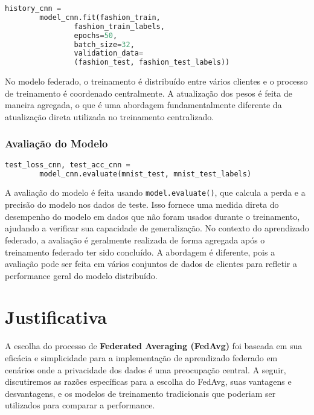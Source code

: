 \begin{lstlisting}[language=Python, caption={Treinamento do modelo centralizado}, label={lst:centralized_training}]
    history_cnn = 
        model_cnn.fit(fashion_train, 
                fashion_train_labels,
                epochs=50,
                batch_size=32,
                validation_data=
                (fashion_test, fashion_test_labels))
\end{lstlisting}

No modelo federado, o treinamento é distribuído entre vários clientes e o processo de treinamento é coordenado centralmente. A atualização dos pesos é feita de maneira agregada, o que é uma abordagem fundamentalmente diferente da atualização direta utilizada no treinamento centralizado.

\subsubsection{Avaliação do Modelo}

\begin{lstlisting}[language=Python, caption={Avaliação do modelo centralizado}, label={lst:centralized_evaluation}]
    test_loss_cnn, test_acc_cnn = 
        model_cnn.evaluate(mnist_test, mnist_test_labels)
\end{lstlisting}

A avaliação do modelo é feita usando \texttt{model.evaluate()}, que calcula a perda e a precisão do modelo nos dados de teste. Isso fornece uma medida direta do desempenho do modelo em dados que não foram usados durante o treinamento, ajudando a verificar sua capacidade de generalização. No contexto do aprendizado federado, a avaliação é geralmente realizada de forma agregada após o treinamento federado ter sido concluído. A abordagem é diferente, pois a avaliação pode ser feita em vários conjuntos de dados de clientes para refletir a performance geral do modelo distribuído.

\section{Justificativa}

A escolha do processo de \textbf{Federated Averaging (FedAvg)} foi baseada em sua eficácia e simplicidade para a implementação de aprendizado federado em cenários onde a privacidade dos dados é uma preocupação central. A seguir, discutiremos as razões específicas para a escolha do FedAvg, suas vantagens e desvantagens, e os modelos de treinamento tradicionais que poderiam ser utilizados para comparar a performance.

